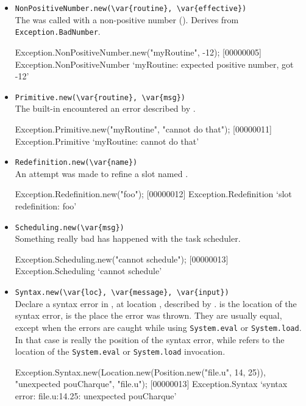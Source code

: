 \begin{itemize}
\item \lstinline|NonPositiveNumber.new(\var{routine}, \var{effective})|\\
  The  was called with a non-positive number
  ().  Derives from \lstinline|Exception.BadNumber|.
\begin{urbiscript}
Exception.NonPositiveNumber.new("myRoutine", -12);
[00000005] Exception.NonPositiveNumber `myRoutine: expected positive number, got -12'
\end{urbiscript}

\item \lstinline|Primitive.new(\var{routine}, \var{msg})|\\
  The built-in  encountered an error described by
  .
\begin{urbiscript}
Exception.Primitive.new("myRoutine", "cannot do that");
[00000011] Exception.Primitive `myRoutine: cannot do that'
\end{urbiscript}

\item \lstinline|Redefinition.new(\var{name})|\\
  An attempt was made to refine a slot named .
\begin{urbiscript}
Exception.Redefinition.new("foo");
[00000012] Exception.Redefinition `slot redefinition: foo'
\end{urbiscript}

\item \lstinline|Scheduling.new(\var{msg})|\\
  Something really bad has happened with the \urbi task scheduler.
\begin{urbiscript}
Exception.Scheduling.new("cannot schedule");
[00000013] Exception.Scheduling `cannot schedule'
\end{urbiscript}

\item \lstinline|Syntax.new(\var{loc}, \var{message}, \var{input})|\\
  Declare a syntax error in , at location ,
  described by .   is the location of the syntax
  error,  is the place the error was thrown.  They are
  usually equal, except when the errors are caught while using
  \lstinline|System.eval| or \lstinline|System.load|.  In that case
   is really the position of the syntax error, while
   refers to the location of the \lstinline|System.eval|
  or \lstinline|System.load| invocation.
\begin{urbiscript}
Exception.Syntax.new(Location.new(Position.new("file.u", 14, 25)),
                     "unexpected pouCharque", "file.u");
[00000013] Exception.Syntax `syntax error: file.u:14.25: unexpected pouCharque'


\end{urbiscript}
\end{itemize}

